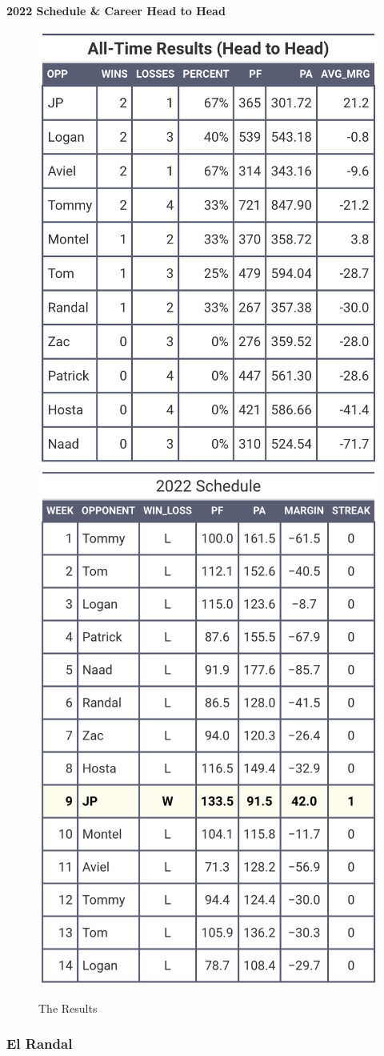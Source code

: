 \documentclass[
]{article}
\begin{document}
\textbf{2022 Schedule \& Career Head to Head}

\begin{figure}
\includegraphics[width=0.5\linewidth,height=0.5\textheight]{output/headtohead/Conor_head_to_head} \includegraphics[width=0.5\linewidth,height=0.5\textheight]{output/py_schedule/season_results_Conor} \caption{The Results}\label{fig:unnamed-chunk-28}
\end{figure}

\hypertarget{el-randal}{%
\subsubsection{El Randal}\label{el-randal}}
\end{document}
